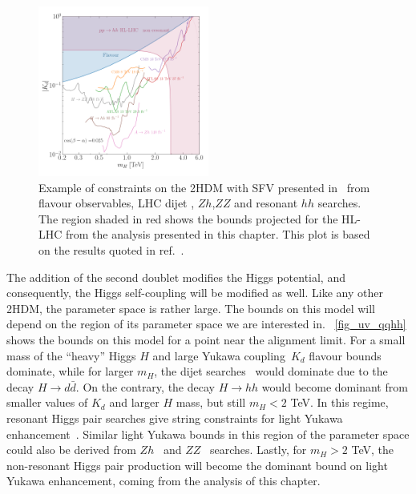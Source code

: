 \begin{figure}[!t]
	\centering
	\includegraphics[width = 0.5\textwidth]{./fig/2HDM-bound_full}
	\vspace{-0.5 cm}
	\caption{Example of constraints on the 2HDM with SFV presented in~\cite{Egana-Ugrinovic:2019dqu,Egana-Ugrinovic:2021uew} from flavour observables, LHC dijet , $Zh$,$ZZ$ and resonant $hh$ searches. The region shaded in red shows the bounds projected for the HL-LHC from the analysis presented in this chapter. This plot is based on the results quoted in ref.~\cite{Egana-Ugrinovic:2021uew}. } %
	\label{fig_uv_qqhh}
\end{figure}
The addition of the second doublet modifies the Higgs potential, and consequently, the Higgs self-coupling will be modified as well.  Like any other 2HDM, the parameter space is rather large. The bounds on this model will depend on the region of its parameter space we are interested in.  ~\autoref{fig_uv_qqhh} shows the bounds on this model for a point near the alignment limit. For a small mass of the ``heavy'' Higgs $H$ and large Yukawa coupling~$K_d$ flavour bounds dominate, while for larger $m_H$, the dijet searches~\cite{Aaboud:2019zxd,Aad:2019hjw,Sirunyan:2019vgj}  would dominate due to the decay $ H \to d \bar d$.  On the contrary, the decay $ H \to hh$ would become dominant from smaller values of $K_d$ and larger $H$ mass, but still $ m_H < 2$ TeV. In this regime, resonant Higgs pair searches give string constraints for light Yukawa enhancement~\cite{Sirunyan:2018ayu, Aad:2019uzh}. Similar  light Yukawa bounds in this region of the parameter space could also be derived from  $Zh$~\cite{ATLAS:2020pgp} and $ZZ$~\cite{Aad:2020fpj, Sirunyan:2018qlb} searches.  Lastly, for $ m_H > 2$ TeV, the non-resonant Higgs pair production will become the dominant bound on light Yukawa enhancement, coming from the analysis of this chapter.  


